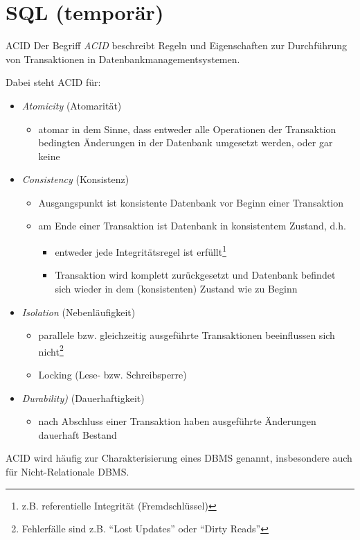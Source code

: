 \section{SQL (temporär)}

\begin{defi}{ACID}
    Der Begriff \emph{ACID} beschreibt Regeln und Eigenschaften zur Durchführung von Transaktionen in Datenbankmanagementsystemen.

    Dabei steht ACID für:
    \begin{itemize}
        \item \emph{Atomicity} (Atomarität)
              \begin{itemize}
                  \item atomar in dem Sinne, dass entweder alle Operationen der Transaktion bedingten Änderungen in der Datenbank umgesetzt werden, oder gar keine
              \end{itemize}
        \item \emph{Consistency} (Konsistenz)
              \begin{itemize}
                  \item Ausgangspunkt ist konsistente Datenbank vor Beginn einer Transaktion
                  \item am Ende einer Transaktion ist Datenbank in konsistentem Zustand, d.h.
                        \begin{itemize}
                            \item entweder jede Integritätsregel ist erfüllt\footnote{z.B. referentielle Integrität (Fremdschlüssel)}
                            \item Transaktion wird komplett zurückgesetzt und Datenbank befindet sich wieder in dem (konsistenten) Zustand wie zu Beginn
                        \end{itemize}
              \end{itemize}
        \item \emph{Isolation} (Nebenläufigkeit)
              \begin{itemize}
                  \item parallele bzw. gleichzeitig ausgeführte Transaktionen beeinflussen sich nicht\footnote{Fehlerfälle sind z.B. \enquote{Lost Updates} oder \enquote{Dirty Reads}}
                  \item Locking (Lese- bzw. Schreibsperre)
              \end{itemize}
        \item \emph{Durability)} (Dauerhaftigkeit)
              \begin{itemize}
                  \item nach Abschluss einer Transaktion haben ausgeführte Änderungen dauerhaft Bestand
              \end{itemize}
    \end{itemize}

    ACID wird häufig zur Charakterisierung eines DBMS genannt, insbesondere auch für Nicht-Relationale DBMS.
\end{defi}

